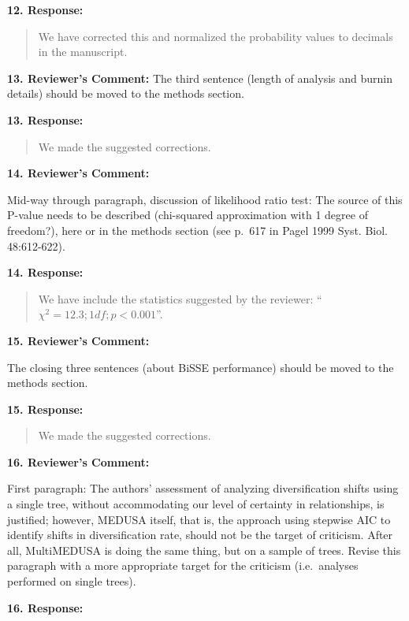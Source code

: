 \documentclass[]{article}
\begin{document}
\textbf{12. Response:}

\begin{quote}
\color{blue}
We have corrected this and normalized the probability values to decimals
in the manuscript.
\end{quote}

\textbf{13. Reviewer's Comment:} The third sentence (length of analysis
and burnin details) should be moved to the methods section.

\textbf{13. Response:}

\begin{quote}
\color{blue}
We made the suggested corrections.
\end{quote}

\textbf{14. Reviewer's Comment:}

Mid-way through paragraph, discussion of likelihood ratio test: The
source of this P-value needs to be described (chi-squared approximation
with 1 degree of freedom?), here or in the methods section (see p.~617
in Pagel 1999 Syst. Biol. 48:612-622).

\textbf{14. Response:}

\begin{quote}
\color{blue}
We have include the statistics suggested by the reviewer:
``\textbf{\(\chi^2 = 12.3; 1 df; p < 0.001\)}''.
\end{quote}

\textbf{15. Reviewer's Comment:}

The closing three sentences (about BiSSE performance) should be moved to
the methods section.

\textbf{15. Response:}

\begin{quote}
\color{blue}
We made the suggested corrections.
\end{quote}

\textbf{16. Reviewer's Comment:}

First paragraph: The authors' assessment of analyzing diversification
shifts using a single tree, without accommodating our level of certainty
in relationships, is justified; however, MEDUSA itself, that is, the
approach using stepwise AIC to identify shifts in diversification rate,
should not be the target of criticism. After all, MultiMEDUSA is doing
the same thing, but on a sample of trees. Revise this paragraph with a
more appropriate target for the criticism (i.e.~analyses performed on
single trees).

\textbf{16. Response:}
\end{document}
